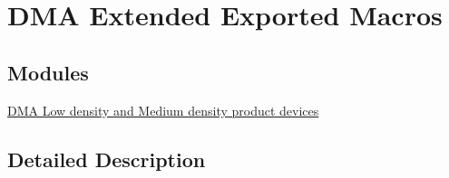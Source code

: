 \hypertarget{group___d_m_a_ex___exported___macros}{}\section{D\+MA Extended Exported Macros}
\label{group___d_m_a_ex___exported___macros}
\subsection*{Modules}
\begin{DoxyCompactItemize}
\item 
\hyperlink{group___d_m_a___low__density___medium__density___product__devices}{D\+M\+A Low density and Medium density product devices}
\end{DoxyCompactItemize}


\subsection{Detailed Description}
